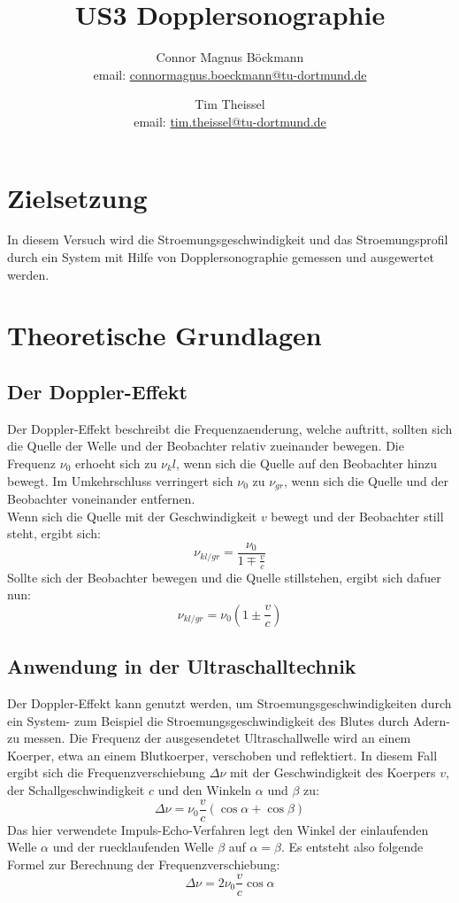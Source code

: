 \documentclass[titlepage=firstcover, captions=tableheading]{scrartcl}
\title{US3 Dopplersonographie}
\author{
Connor Magnus Böckmann \\ email: \href{mailto:connormagnus.boeckmann@tu-dortmund.de}{connormagnus.boeckmann@tu-dortmund.de}
\and Tim Theissel \\ email: \href{mailto:tim.theissel@tu-dortmund.de}{tim.theissel@tu-dortmund.de}}
\begin{document}
\maketitle
\newpage
\tableofcontents
\newpage
\section{Zielsetzung}
In diesem Versuch wird die Stroemungsgeschwindigkeit und das Stroemungsprofil durch ein System mit Hilfe von Dopplersonographie gemessen und ausgewertet werden. 
\section{Theoretische Grundlagen}
\subsection{Der Doppler-Effekt}
Der Doppler-Effekt beschreibt die Frequenzaenderung, welche auftritt, sollten sich die Quelle der Welle und der Beobachter relativ zueinander bewegen. Die Frequenz $\nu_0$ erhoeht sich zu $\nu_kl$, wenn sich die Quelle auf den Beobachter hinzu bewegt. Im Umkehrschluss verringert sich $\nu_0$ zu $\nu_{gr}$, wenn sich die Quelle und der Beobachter voneinander entfernen.\\
Wenn sich die Quelle mit der Geschwindigkeit $v$ bewegt und der Beobachter still steht, ergibt sich:
\begin{equation}
    \nu_{kl/gr}=\frac{\nu_0}{1\mp\frac{v}{c}}
\end{equation}
Sollte sich der Beobachter bewegen und die Quelle stillstehen, ergibt sich dafuer nun:
\begin{equation}
    \nu_{kl/gr}=\nu_0(1\pm\frac{v}{c})
\end{equation}
\subsection{Anwendung in der Ultraschalltechnik}
Der Doppler-Effekt kann genutzt werden, um Stroemungsgeschwindigkeiten durch ein System- zum Beispiel die Stroemungsgeschwindigkeit des Blutes durch Adern- zu messen. Die Frequenz der ausgesendetet Ultraschallwelle wird an einem Koerper, etwa an einem Blutkoerper, verschoben und reflektiert. In diesem Fall ergibt sich die Frequenzverschiebung $\Delta\nu$ mit der Geschwindigkeit des Koerpers $v$, der Schallgeschwindigkeit $c$ und den Winkeln $\alpha$ und $\beta$ zu:
\begin{equation}
    \Delta\nu=\nu_0\frac{v}{c}(\cos\alpha+\cos\beta)
\end{equation}
Das hier verwendete Impuls-Echo-Verfahren legt den Winkel der einlaufenden Welle $\alpha$ und der ruecklaufenden Welle $\beta$ auf $\alpha=\beta$. Es entsteht also folgende Formel zur Berechnung der Frequenzverschiebung:
\begin{equation}
    \Delta\nu=2\nu_0\frac{v}{c}\cos\alpha \label{4}
\end{equation} \newpage
\end{document}
